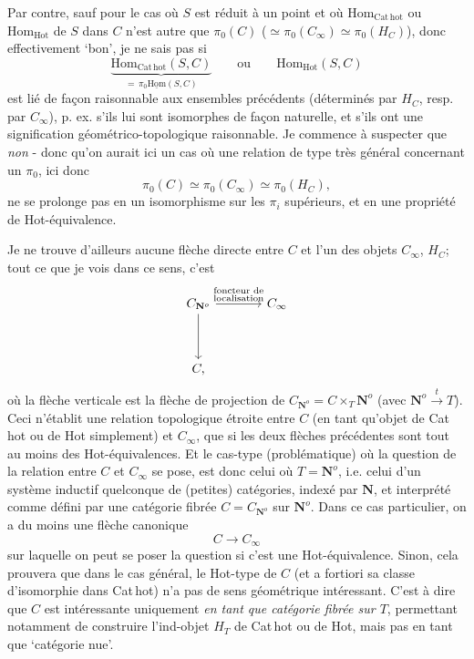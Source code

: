 \documentclass[11pt]{article}
\newcommand{\printedpage}[1]{\marginpar{\footnotesize p.~#1}}
\newcommand{\msp}[1]{\marginpar{\footnotesize [#1]}}
\newcommand{\Hom}{\mathrm{Hom}}
\newcommand{\uHom}{\underline{\mathrm{Hom}}}
\newcommand{\Cathot}{\mathrm{Cat\,hot}}
\newcommand{\Hot}{\mathrm{Hot}}
\newcommand{\CNo}{C_{\mathbf{N}^{o}}}
\begin{document}
Par contre, sauf pour le cas où $S$ est réduit à un point et où $\Hom_{\Cathot}$ ou $\Hom_{\Hot}$ de $S$ dans $C$ n'est autre que $\pi_{0}(C)$ ($\simeq \pi_{0}(C_{\infty}) \simeq \pi_{0}(H_{C})$), donc effectivement ‘bon', je ne sais pas si
\[
\underbrace{\Hom_{\Cathot}(S,C)}_{=\,\pi_{0}\uHom(S,C)} \qquad \text{ou} \qquad \Hom_{\Hot}(S,C)
\]
est lié de façon raisonnable aux ensembles précédents (déterminés par $H_{C}$, resp. par $C_{\infty}$), p. ex. s'ils lui sont isomorphes de façon naturelle, et s'ils ont une signification géométrico-topologique raisonnable. Je commence à suspecter que \textit{non} - donc qu'on aurait ici un cas où une relation de type très général concernant un $\pi_{0}$, ici donc
\[
\pi_{0}(C) \simeq \pi_{0}(C_{\infty}) \simeq \pi_{0}(H_{C}),
\]
ne se prolonge pas en un isomorphisme sur les $\pi_{i}$ supérieurs, et en une propriété de Hot-équivalence.

\printedpage{69}

\msp{page 108}
Je ne trouve d'ailleurs aucune flèche directe entre $C$ et l'un des objets $C_{\infty}$, $H_{C}$; tout ce que je vois dans ce sens, c'est
\[
\begin{tikzcd}[column sep=large, row sep=huge]
\CNo \arrow[r, "{\substack{\text{foncteur de}\\ \text{localisation}}}"] \arrow[d] & C_{\infty} \\
C, &
\end{tikzcd}
\]
où la flèche verticale est la flèche de projection de $\CNo = C \times_{T} \mathbf{N}^{o}$ (avec $\mathbf{N}^{o} \xrightarrow{\ t\ } T$). Ceci n'établit une relation topologique étroite entre $C$ (en tant qu'objet de Cat\,hot ou de Hot simplement) et $C_{\infty}$, que si les deux flèches précédentes sont tout au moins des Hot-équivalences. Et le cas-type (problématique) où la question de la relation entre $C$ et $C_{\infty}$ se pose, est donc celui où $T = \mathbf{N}^{o}$, i.e. celui d'un système inductif quelconque de (petites) catégories, indexé par $\mathbf{N}$, et interprété comme défini par une catégorie fibrée $C = \CNo$ sur $\mathbf{N}^{o}$. Dans ce cas particulier, on a du moins une flèche canonique
\[
C \longrightarrow C_{\infty}
\]
sur laquelle on peut se poser la question si c'est
\msp{page 109}
une Hot-équivalence. Sinon, cela prouvera que dans le cas général, le Hot-type de $C$ (et a fortiori sa classe d'isomorphie dans Cat\,hot) n'a pas de sens géométrique intéressant. C'est à dire que $C$ est intéressante uniquement \textit{en tant que catégorie fibrée sur $T$}, permettant notamment de construire l'ind-objet $H_{T}$ de Cat\,hot ou de Hot, mais pas en tant que `catégorie nue'.
\end{document}
